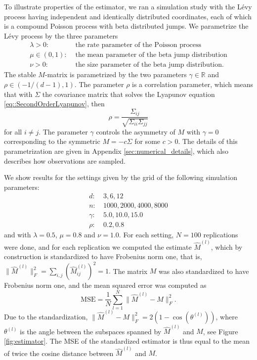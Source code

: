 \documentclass{biometrika}
\begin{document}
To illustrate properties of the estimator, we ran a simulation study with the 
Lévy process having independent and identically distributed coordinates, each of which is a 
compound Poisson process with beta distributed jumps. We parametrize the Lévy process by 
the three parameters
\begin{align*}
    \lambda > 0: & \text{ the rate parameter of the Poisson process} \\    
    \mu \in (0, 1): & \text{ the mean parameter of the beta jump distribution} \\    
    \nu > 0: & \text{ the size parameter of the beta jump distribution}. 
\end{align*}
The stable $M$-matrix is parametrized by the two parameters $\gamma \in \mathbb{R}$ and 
$\rho \in (-1/(d-1), 1)$. The parameter $\rho$ is a correlation parameter, which means 
that with $\Sigma$ the covariance matrix that solves the Lyapunov equation \eqref{eq::SecondOrderLyapunov}, then 
$$
    \rho = \frac{\Sigma_{ij}}{\sqrt{\Sigma_{ii} \Sigma_{jj}}}
$$
for all $i \neq j$. The parameter $\gamma$ controls the asymmetry of $M$ with $\gamma = 0$ 
corresponding to the symmetric $M = - c\Sigma$ for some $c > 0$. The details of this 
parametrization are given in Appendix \ref{sec:numerical_details}, which also describes 
how observations are sampled. 

We show results for the settings given by the grid of the following simulation parameters:  
\begin{align*}
    d: & \ 3, 6, 12 \\
    n: & \ 1000, 2000, 4000, 8000 \\
    \gamma: & \ 5.0, 10.0, 15.0 \\
    \rho: & \ 0.2, 0.8 
\end{align*}
and with $\lambda = 0.5$, $\mu = 0.8$ and $\nu = 1.0$. For each setting, $N = 100$ replications 
were done, and for each replication we computed the estimate $\hat{M}^{(l)}$, which by 
construction is standardized to have Frobenius norm one, that is, 
$
    \| \hat{M}^{(l)} \|_F^2 = \sum_{i,j} (\hat{M}_{ij}^{(l)})^2 = 1.
$
The matrix $M$ was also standardized to have Frobenius norm one, and the 
mean squared error was computed as
$$
    \mathrm{MSE} = \frac{1}{N} \sum_{l = 1}^N \| \hat{M}^{(l)} - M\|_F^2.
$$
Due to the standardization,  $\| \hat{M}^{(l)} - M\|_F^2 = 2(1 - \cos(\theta^{(l)}))$, 
where $\theta^{(l)}$ is the angle between the subspaces spanned by $\hat{M}^{(l)}$ and $M$, see Figure \ref{fig:estimator}. The MSE of the standardized estimator is thus 
equal to the mean of twice the cosine distance between $\hat{M}^{(l)}$ and $M$.
\end{document}
